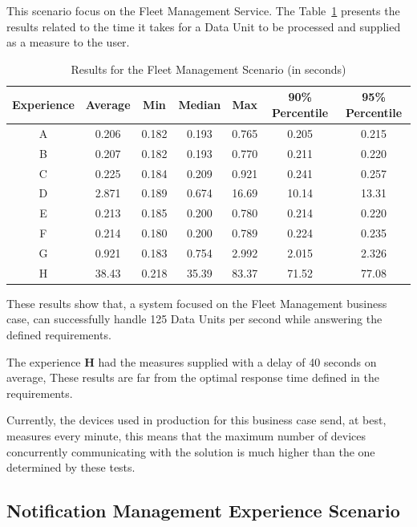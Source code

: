 This scenario focus on the Fleet Management Service. The Table~\ref{tab:evaluation:experiences:fleet:results} presents the results related to the time it takes for a Data Unit to be processed and supplied as a measure to the user.

\begin{table}[H]
    \caption{Results for the Fleet Management Scenario (in seconds)}
    \label{tab:evaluation:experiences:fleet:results}
    \centering
    \begin{tabular}{@{}ccccccc@{}}
    \toprule
    \textbf{Experience} & \textbf{Average} & \textbf{Min} & \textbf{Median} & \textbf{Max} & \textbf{90\% Percentile} & \textbf{95\% Percentile} \\ \midrule
    A & 0.206 & 0.182 & 0.193 & 0.765 & 0.205 & 0.215 \\ \midrule
    B & 0.207 & 0.182 & 0.193 & 0.770 & 0.211 & 0.220 \\ \midrule
    C & 0.225 & 0.184 & 0.209 & 0.921 & 0.241 & 0.257 \\ \midrule
    D & 2.871 & 0.189 & 0.674 & 16.69 & 10.14 & 13.31 \\ \midrule
    E & 0.213 & 0.185 & 0.200 & 0.780 & 0.214 & 0.220 \\ \midrule
    F & 0.214 & 0.180 & 0.200 & 0.789 & 0.224 & 0.235 \\ \midrule
    G & 0.921 & 0.183 & 0.754 & 2.992 & 2.015 & 2.326 \\ \midrule
    H & 38.43 & 0.218 & 35.39 & 83.37 & 71.52 & 77.08 \\ \bottomrule
    \end{tabular}
\end{table}

These results show that, a system focused on the Fleet Management business case, can successfully handle 125 Data Units per second while answering the defined requirements.

The experience \textbf{H} had the measures supplied with a delay of 40 seconds on average, These results are far from the optimal response time defined in the requirements.

Currently, the devices used in production for this business case send, at best, measures every minute, this means that the maximum number of devices concurrently communicating with the solution is much higher than the one determined by these tests.

\subsection{Notification Management Experience Scenario}
\label{subsec:evaluation:experiences:notification}

